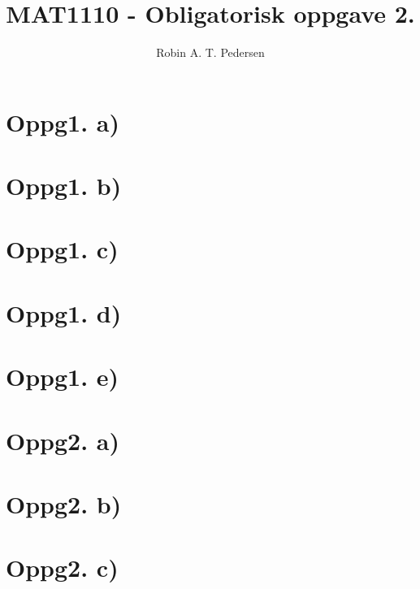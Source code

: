 \documentclass{article}
\begin{document}
  \title{MAT1110 - Obligatorisk oppgave 2.}
  \author{Robin A. T. Pedersen}
  \maketitle

  \section*{Oppg1. a)}
    
  \section*{Oppg1. b)}
    
  \section*{Oppg1. c)}
    
  \section*{Oppg1. d)}
    
  \section*{Oppg1. e)}
    

  \section*{Oppg2. a)}
    
  \section*{Oppg2. b)}
    
  \section*{Oppg2. c)}
    
\end{document}
